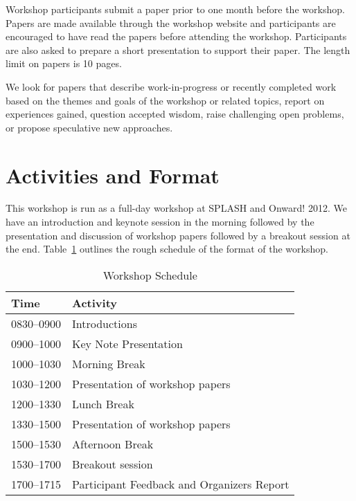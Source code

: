 \documentclass[10pt]{sigplanconf}
\newcommand\comment[1]{#1}
\begin{document}
Workshop participants submit a paper prior to one
month before the workshop. Papers are made available
through the workshop website and participants are encouraged to have
read the papers before attending the workshop. Participants
are also asked to prepare a short presentation to support their
paper. 
The length limit on papers is 10 pages. %


We look for papers that describe work-in-progress or recently completed work based on the themes and goals of the workshop or related topics, report on experiences gained, question accepted wisdom, raise challenging open problems, or propose
speculative new approaches.

\section{Activities and Format}

This workshop is run as a full-day workshop at SPLASH and Onward! 2012.  We
 have an introduction and keynote session in the morning followed
by the presentation and discussion of workshop papers followed by a breakout session at the end. Table~\ref{tab:schedule} outlines the rough schedule of the format of the workshop.

\comment{
\begin{table} [!htbp] %
\arrayrulecolor[gray]{0.8} %
\begin{tabularx}{\columnwidth}{l|X}
\textbf{Time}   & \textbf{Activity} \\
\hline
0830--0900    & Introductions \vspace{1mm} \\
0900--1000    & Key Note Presentation \vspace{1mm} \\
1000--1030     & Morning Break~\vspace{1mm}\\
1030--1200   & Presentation of workshop papers \vspace{1mm}\\
1200--1330     & Lunch Break~\vspace{1mm}\\
1330--1500   & Presentation of workshop papers \vspace{1mm}\\
1500--1530    & Afternoon Break~\vspace{1mm}\\
1530--1700    & Breakout session \vspace{1mm}\\
1700--1715    & Participant Feedback and Organizers Report  \\
\end{tabularx}
\caption{Workshop Schedule}
\label{tab:schedule}
\end{table}
}
\end{document}
